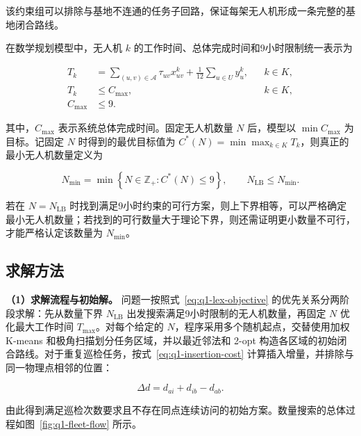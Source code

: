 \documentclass[UTF8,a4paper,12pt]{ctexart}
\numberwithin{equation}{section}
\numberwithin{equation}{section}
\begin{document}
该约束组可以排除与基地不连通的任务子回路，保证每架无人机形成一条完整的基地闭合路线。

在数学规划模型中，无人机 \(k\) 的工作时间、总体完成时间和9小时限制统一表示为

\begin{equation}
\begin{aligned}
  T_k
  &=
  \sum_{(u,v)\in\mathcal A}\tau_{uv}x_{uv}^k
  +\frac{1}{12}\sum_{u\in U}y_u^k,
  &&k\in K,\\
  T_k&\leq C_{\max},
  &&k\in K,\\
  C_{\max}&\leq9.
\end{aligned}
\label{eq:q1-time-constraints}
\end{equation}

其中，\(C_{\max}\) 表示系统总体完成时间。固定无人机数量 \(N\) 后，模型以
\(\min C_{\max}\) 为目标。记固定 \(N\) 时得到的最优目标值为
\(C^*(N)=\min\max_{k\in K}T_k\)，则真正的最小无人机数量定义为

\begin{equation}
  N_{\min}
  =
  \min
  \left\{
  N\in\mathbb Z_+:
  C^*(N)\leq9
  \right\},
  \qquad
  N_{\mathrm{LB}}\leq N_{\min}.
  \label{eq:q1-n-min}
\end{equation}

若在 \(N=N_{\mathrm{LB}}\) 时找到满足9小时约束的可行方案，则上下界相等，可以严格确定最小无人机数量；若找到的可行数量大于理论下界，则还需证明更小数量不可行，才能严格认定该数量为 \(N_{\min}\)。

\subsection{求解方法}

\noindent\textbf{（1）求解流程与初始解。}
问题一按照式~\eqref{eq:q1-lex-objective} 的优先关系分两阶段求解：先从数量下界 \(N_{\mathrm{LB}}\) 出发搜索满足9小时限制的无人机数量，再固定 \(N\) 优化最大工作时间 \(T_{\max}\)。对每个给定的 \(N\)，程序采用多个随机起点，交替使用加权 K-means 和极角扫描划分任务区域，并以最近邻法和 2-opt 构造各区域的初始闭合路线。对于重复巡检任务，按式~\eqref{eq:q1-insertion-cost} 计算插入增量，并排除与同一物理点相邻的位置：

\begin{equation}
  \Delta d=d_{ai}+d_{ib}-d_{ab}.
  \label{eq:q1-insertion-cost}
\end{equation}

由此得到满足巡检次数要求且不存在同点连续访问的初始方案。数量搜索的总体过程如图~\ref{fig:q1-fleet-flow} 所示。
\end{document}
